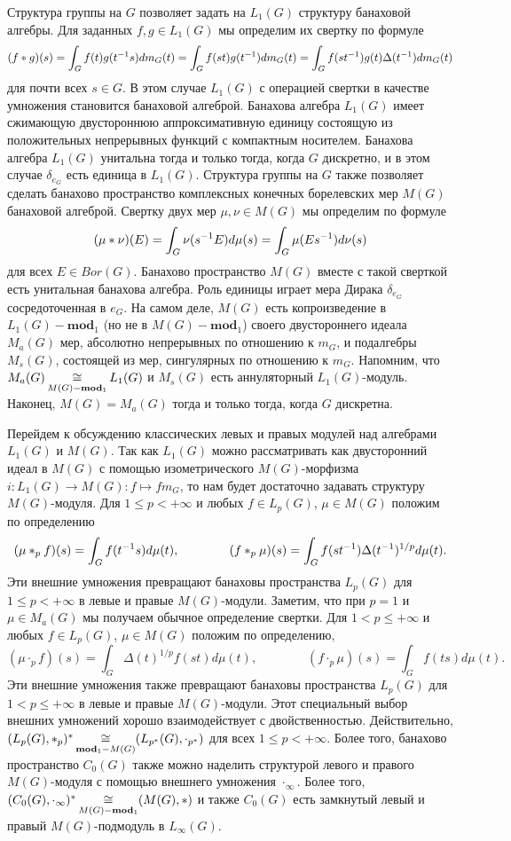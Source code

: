 Структура группы на $G$ позволяет задать на $L_1(G)$ структуру банаховой алгебры. Для заданных $f,g\in L_1(G)$ мы определим их свертку по формуле
$$
(f\ast g)(s)=\int_G f(t)g(t^{-1}s)dm_G(t)=\int_G f(st)g(t^{-1})dm_G(t)=\int_G f(st^{-1})g(t)\Delta(t^{-1})dm_G(t)
$$
для почти всех $s\in G$. В этом случае $L_1(G)$ с операцией свертки в качестве умножения становится банаховой алгеброй. Банахова алгебра $L_1(G)$ имеет сжимающую двустороннюю аппроксимативную единицу состоящую из положительных непрерывных функций с компактным носителем. Банахова алгебра $L_1(G)$ унитальна тогда и только тогда, когда $G$ дискретно, и в этом случае $\delta_{e_G}$ есть единица в $L_1(G)$. Структура группы на $G$ также позволяет сделать банахово пространство комплексных конечных борелевских мер $M(G)$ банаховой алгеброй. Свертку двух мер $\mu,\nu\in M(G)$ мы определим по формуле
$$
(\mu\ast \nu)(E)=\int_G\nu(s^{-1}E)d\mu(s)=\int_G\mu(Es^{-1})d\nu(s)
$$
для всех $E\in Bor(G)$. Банахово пространство $M(G)$ вместе с такой сверткой есть унитальная банахова алгебра. Роль единицы играет  мера Дирака $\delta_{e_G}$ сосредоточенная в $e_G$. На самом деле, $M(G)$ есть копроизведение в $L_1(G)-\mathbf{mod}_1$ (но не в $M(G)-\mathbf{mod}_1$) своего двустороннего идеала $M_a(G)$ мер, абсолютно непрерывных по отношению к $m_G$, и подалгебры $M_s(G)$, состоящей из мер, сингулярных по отношению к $m_G$. Напомним, что $M_a(G)\mathop{\mathbin{\cong}}\limits_{M(G)-\mathbf{mod}_1}L_1(G)$ и $M_s(G)$ есть аннуляторный $L_1(G)$-модуль. Наконец, $M(G)=M_a(G)$ тогда и только тогда, когда $G$ дискретна. 

Перейдем к обсуждению классических левых и правых модулей над алгебрами $L_1(G)$ и $M(G)$. Так как $L_1(G)$ можно рассматривать как двусторонний идеал в $M(G)$ с помощью изометрического $M(G)$-морфизма $i:L_1(G)\to M(G):f\mapsto f m_G$, то нам будет достаточно задавать структуру $M(G)$-модуля. Для $1\leq p<+\infty$ и любых $f\in L_p(G)$, $\mu\in M(G)$ положим по определению
$$
(\mu\ast_p f)(s)=\int_G f(t^{-1}s)d\mu(t),
\qquad\qquad
(f\ast_p \mu)(s)=\int_G f(st^{-1})\Delta(t^{-1})^{1/p}d\mu(t).
$$
Эти внешние умножения превращают банаховы пространства $L_p(G)$ для $1\leq p<+\infty$ в левые и правые $M(G)$-модули. Заметим, что при $p=1$ и $\mu\in M_a(G)$ мы получаем обычное определение свертки. Для $1<p\leq +\infty$ и любых $f\in L_p(G)$, $\mu\in M(G)$ положим по определению,
$$
(\mu\cdot_p f)(s)=\int_G \Delta(t)^{1/p}f(st)d\mu(t),
\qquad\qquad
(f\cdot_p \mu)(s)=\int_G f(ts)d\mu(t).
$$
Эти внешние умножения также превращают банаховы пространства $L_p(G)$ для $1<p\leq+\infty$ в левые и правые $M(G)$-модули. Этот специальный выбор внешних умножений хорошо взаимодействует с двойственностью. Действительно, $(L_p(G),\ast_p)^*\mathop{\mathbin{\cong}}\limits_{\mathbf{mod}_1-M(G)}(L_{p^*}(G),\cdot_{p^*})$ для всех $1\leq p<+\infty$. Более того, банахово пространство $C_0(G)$ также можно наделить структурой левого и правого $M(G)$-модуля с помощью внешнего умножения $\cdot_\infty$. Более того, $(C_0(G),\cdot_\infty)^*\mathop{\mathbin{\cong}}\limits_{M(G)-\mathbf{mod}_1}(M(G),\ast)$ и также $C_0(G)$ есть замкнутый левый и правый $M(G)$-подмодуль в $L_\infty(G)$.

